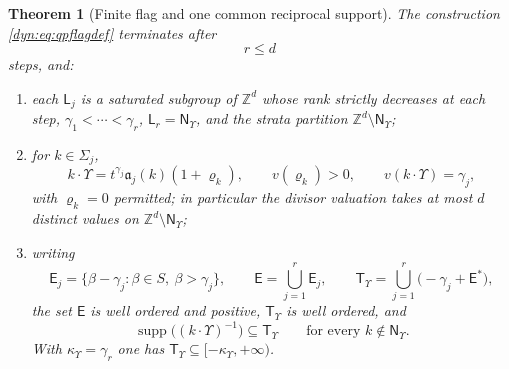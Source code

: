 \documentclass[11pt,letterpaper]{article}
\newtheorem{theorem}{Theorem}[section]
\theoremstyle{definition}
\theoremstyle{remark}
\newcommand{\Z}{\mathbb Z}
\newcommand{\supp}{\operatorname{supp}}
\newcommand{\Tups}{\mathsf T_{\Upsilon}}
\newcommand{\qlat}{\mathsf N_{\Upsilon}}
\newcommand{\kups}{\kappa_{\Upsilon}}
\newcommand{\fla}{\mathfrak a}
\numberwithin{equation}{section}
\begin{document}
\begin{theorem}[Finite flag and one common reciprocal support]
\label{dyn:thm:flag}
The construction \eqref{dyn:eq:qpflagdef} terminates after
\begin{equation}\label{dyn:eq:qprbound}
 r\le d
\end{equation}
steps, and:
\begin{enumerate}[label=(\roman*),leftmargin=*]
\item each $\mathsf L_j$ is a saturated subgroup of $\Z^{d}$ whose rank
strictly decreases at each step, $\gamma_1<\cdots<\gamma_r$,
$\mathsf L_r=\qlat$, and the strata partition $\Z^{d}\setminus\qlat$;
\item for $k\in\Sigma_j$,
\begin{equation}\label{dyn:eq:qpleading}
 k\cdot\Upsilon=t^{\gamma_j}\fla_j(k)(1+\varrho_k),\qquad
 v(\varrho_k)>0,\qquad v(k\cdot\Upsilon)=\gamma_j,
\end{equation}
with $\varrho_k=0$ permitted; in particular the divisor valuation takes at
most $d$ distinct values on $\Z^{d}\setminus\qlat$;
\item writing
\begin{equation}\label{dyn:eq:qpE}
 \mathsf E_j=\{\beta-\gamma_j:\beta\in S,\ \beta>\gamma_j\},\qquad
 \mathsf E=\bigcup_{j=1}^{r}\mathsf E_j,\qquad
 \Tups=\bigcup_{j=1}^{r}\bigl(-\gamma_j+\mathsf E^{*}\bigr),
\end{equation}
the set $\mathsf E$ is well ordered and positive, $\Tups$ is well ordered,
and
\begin{equation}\label{dyn:eq:qpTsupport}
 \supp\bigl((k\cdot\Upsilon)^{-1}\bigr)\subseteq\Tups
 \qquad\text{for every }k\notin\qlat .
\end{equation}
With $\kups=\gamma_r$ one has $\Tups\subseteq[-\kups,+\infty)$.
\end{enumerate}
\end{theorem}
\end{document}
